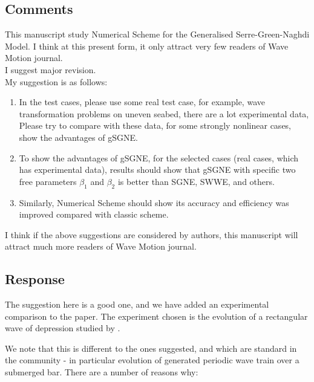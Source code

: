 \documentclass[10pt]{article}
\begin{document}
\subsection{Comments}
This manuscript study Numerical Scheme for the Generalised Serre-Green-Naghdi Model. I think at this present form, it only attract very few readers of Wave Motion journal.
\\
I suggest major revision.
\\
My suggestion is as follows:
\begin{enumerate}
	\item In the test cases, please use some real test case, for example, wave transformation problems on uneven seabed, there are a lot experimental data,
	Please try to compare with these data, for some strongly nonlinear cases, show the advantages of gSGNE.
	
	\item
	To show the advantages of gSGNE, for the selected cases (real cases, which has experimental data), results should show that
	gSGNE with specific two free parameters $\beta_1$ and $\beta_2$ is better than SGNE, SWWE, and others.
	
	\item  Similarly, Numerical Scheme should show its accuracy and efficiency was improved compared with classic scheme.
	
	
\end{enumerate}
I think if the above suggestions are considered by authors, this manuscript will attract much more readers of Wave Motion journal.

\subsection{Response}
The suggestion here is a good one, and we have added an experimental comparison to the paper. The experiment chosen is the evolution of a rectangular wave of depression studied by \citet{Hammack-Segur-1978-337}.

We note that this is different to the ones suggested, and which are standard in the community - in particular evolution of generated periodic wave train over a submerged bar. There are a number of reasons why:
\end{document}
